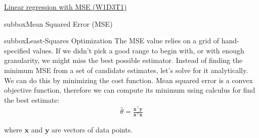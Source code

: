 \begin{textbox}{\href{https://compneuro.neuromatch.io/tutorials/W1D3_ModelFitting/chapter_title.html}{Linear regression with MSE (W1D3T1)}}
\begin{subbox}{subbox}{Mean Squared Error (MSE)}
\end{subbox}
\begin{subbox}{subbox}{Least-Squares Optimization}
\scriptsize
The MSE value relies on a grid of hand-specified values. If we didn't pick a good range to begin with, or with enough granularity, we might miss the best possible estimator. Instead of finding the minimum MSE from a set of candidate estimates, let's solve for it analytically.
We can do this by minimizing the cost function. Mean squared error is a convex objective function, therefore we can compute its minimum using calculus for find the best estimate: \begin{align}
\hat\theta = \frac{\mathbf{x}^\top \mathbf{y}}{\mathbf{x}^\top \mathbf{x}}
\end{align}

where $\mathbf{x}$ and $\mathbf{y}$ are vectors of data points.

\end{subbox}

\end{textbox}
